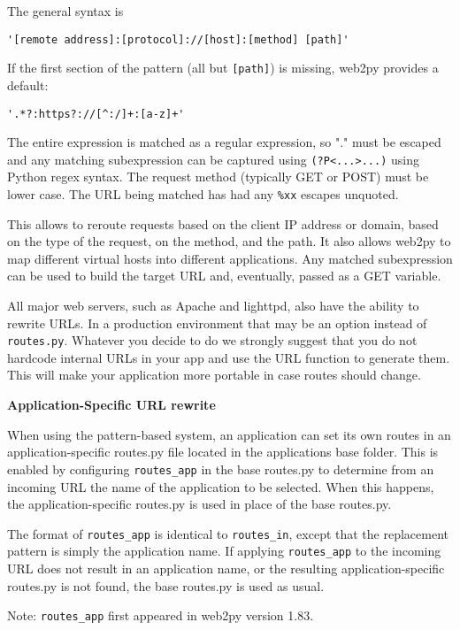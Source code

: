 \documentclass[justified,sixbynine,notoc]{tufte-book}
\def\ft{\small\tt}
\def\inxx#1{\index{#1}}
\begin{document}
\begin{fullwidth}
The general syntax is
\begin{lstlisting}
'[remote address]:[protocol]://[host]:[method] [path]'
\end{lstlisting}

If the first section of the pattern (all but {\ft [path]}) is missing, web2py provides a default:
\begin{lstlisting}
'.*?:https?://[^:/]+:[a-z]+'
\end{lstlisting}

The entire expression is matched as a regular expression, so "." must be escaped and any matching subexpression can be captured using {\ft (?P<...>...)} using Python regex syntax. The request method (typically GET or POST) must be lower case. The URL being matched has had any {\ft \%xx} escapes unquoted.

This allows to reroute requests based on the client IP address or domain, based on the type of the request, on the method, and the path. It also allows web2py to map different virtual hosts into different applications. Any matched subexpression can be used to build the target URL and, eventually, passed as a GET variable.

All major web servers, such as Apache and lighttpd, also have the ability to rewrite URLs. In a production environment that may be an option instead of {\ft routes.py}. Whatever you decide to do we strongly suggest that you do not hardcode internal URLs in your app and use the URL function to generate them. This will make your application more portable in case routes should change.

{\bf Application-Specific URL rewrite}

\inxx{routes\_app}
When using the pattern-based system, an application can set its own routes in an application-specific routes.py file located in the applications base folder. This is enabled by configuring {\ft routes\_app} in the base routes.py to determine from an incoming URL the name of the application to be selected. When this happens, the application-specific routes.py is used in place of the base routes.py.

The format of {\ft routes\_app} is identical to {\ft routes\_in}, except that the replacement pattern is simply the application name. If applying {\ft routes\_app} to the incoming URL does not result in an application name, or the resulting application-specific routes.py is not found, the base routes.py is used as usual.

Note: {\ft routes\_app} first appeared in web2py version 1.83.


\end{fullwidth}
\end{document}
